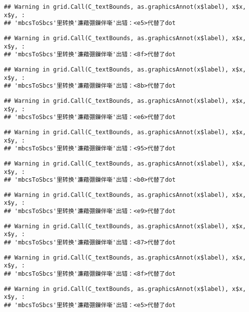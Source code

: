 \documentclass[]{article}
\begin{document}
\begin{verbatim}
## Warning in grid.Call(C_textBounds, as.graphicsAnnot(x$label), x$x, x$y, :
## 'mbcsToSbcs'里转换'濂藉弸鏁伴噺'出错：<e5>代替了dot
\end{verbatim}

\begin{verbatim}
## Warning in grid.Call(C_textBounds, as.graphicsAnnot(x$label), x$x, x$y, :
## 'mbcsToSbcs'里转换'濂藉弸鏁伴噺'出错：<8f>代替了dot
\end{verbatim}

\begin{verbatim}
## Warning in grid.Call(C_textBounds, as.graphicsAnnot(x$label), x$x, x$y, :
## 'mbcsToSbcs'里转换'濂藉弸鏁伴噺'出错：<8b>代替了dot
\end{verbatim}

\begin{verbatim}
## Warning in grid.Call(C_textBounds, as.graphicsAnnot(x$label), x$x, x$y, :
## 'mbcsToSbcs'里转换'濂藉弸鏁伴噺'出错：<e6>代替了dot
\end{verbatim}

\begin{verbatim}
## Warning in grid.Call(C_textBounds, as.graphicsAnnot(x$label), x$x, x$y, :
## 'mbcsToSbcs'里转换'濂藉弸鏁伴噺'出错：<95>代替了dot
\end{verbatim}

\begin{verbatim}
## Warning in grid.Call(C_textBounds, as.graphicsAnnot(x$label), x$x, x$y, :
## 'mbcsToSbcs'里转换'濂藉弸鏁伴噺'出错：<b0>代替了dot
\end{verbatim}

\begin{verbatim}
## Warning in grid.Call(C_textBounds, as.graphicsAnnot(x$label), x$x, x$y, :
## 'mbcsToSbcs'里转换'濂藉弸鏁伴噺'出错：<e9>代替了dot
\end{verbatim}

\begin{verbatim}
## Warning in grid.Call(C_textBounds, as.graphicsAnnot(x$label), x$x, x$y, :
## 'mbcsToSbcs'里转换'濂藉弸鏁伴噺'出错：<87>代替了dot
\end{verbatim}

\begin{verbatim}
## Warning in grid.Call(C_textBounds, as.graphicsAnnot(x$label), x$x, x$y, :
## 'mbcsToSbcs'里转换'濂藉弸鏁伴噺'出错：<8f>代替了dot
\end{verbatim}

\begin{verbatim}
## Warning in grid.Call(C_textBounds, as.graphicsAnnot(x$label), x$x, x$y, :
## 'mbcsToSbcs'里转换'濂藉弸鏁伴噺'出错：<e5>代替了dot
\end{verbatim}
\end{document}
